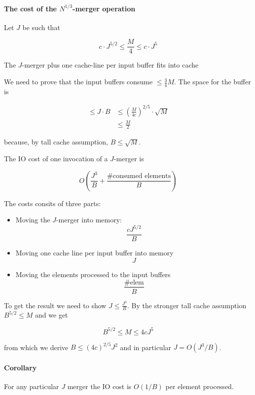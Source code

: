 \paragraph{The cost of the $N^{1/3}$-merger operation} Let $J$ be such that 

\[c\cdot J^{5/2} \leq \frac M4 \leq c\cdot J^5\]

\begin{lem} The $J$-merger plus one cache-line per input buffer fits into cache
\end{lem}

\begin{pr} We need to prove that the input buffers consume $\leq \frac 34 M$. The space for the buffer is

\begin{align*}
\leq J\cdot B &\leq \left(\frac{M}{4c}\right)^{2/5}\cdot \sqrt{M}\\
	&\leq \frac M2
\end{align*}

because, by tall cache assumption, $B\leq \sqrt M$.
\end{pr}

\begin{lem} The IO cost of one invocation of a $J$-merger is 

\[O(\frac{J^3}{B} + \frac{\text{\# consumed elements}}{B})\]
\end{lem}

\begin{pr} The costs consits of three parts:
\begin{itemize}
\item Moving the $J$-merger into memory: \[\frac{cJ^{5/2}}{B}\]
\item Moving one cache line per input buffer into memory \[J\]
\item Moving the elements processed to the input buffers \[\frac{\text{\# elem}}{B}\]
\end{itemize}

To get the result we need to show $J \leq \frac{J^3}{B}$. By the stronger tall cache assumption $B^{5/2}\leq M$ and we get

\[B^{5/2} \leq M \leq 4cJ^5\]

from which we derive $B\leq (4c)^{2/5} J^2$ and in particular $J=O(J^3/B)$.
\end{pr}

\paragraph{Corollary} For any particular $J$ merger the IO cost is $O(1/B)$ per element processed. 

